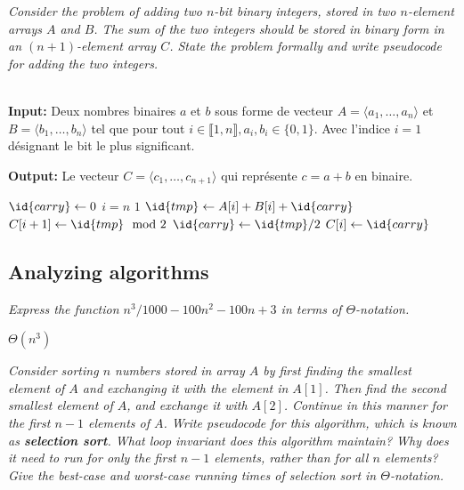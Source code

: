 \begin{description}
\begin{ex}
\end{ex}

 {\itshape Consider the problem of adding two $n$-bit binary integers, stored in two $n$-element arrays $A$ and $B$. The sum of the two integers should be stored in binary form in an $(n+1)$-element array $C$.  State the problem formally and write pseudocode for adding the two integers.}

  \begin{ex}\\
    {\bfseries Input:} Deux nombres binaires $a$ et $b$ sous forme de vecteur $A = \langle a_1, \ldots, a_n \rangle$ et $B = \langle b_1, \ldots, b_n \rangle$ tel que pour tout $i \in \llbracket 1,n \rrbracket, a_i, b_i \in \{0,1\}$. Avec l'indice $i=1$ désignant le bit le plus significant.

    {\bfseries Output:} Le vecteur $C = \langle c_1, \ldots, c_{n+1} \rangle$ qui représente $c = a+b$ en binaire.
    
    \begin{codebox}
      \li $\id{carry} \gets 0 $
      \li \For $i=n$ \Downto $1$ \Do
      \li $\id{tmp} \gets A[i] + B[i] + \id{carry}$
      \li $C[i+1] \gets \id{tmp} \mod 2$
      \li $\id{carry} \gets \id{tmp}/2$\End
      \li $C[i] \gets \id{carry}$
    \end{codebox}
    
  \end{ex}
\subsection{Analyzing algorithms}

 {\itshape Express the function $n^3/1000-100n^2-100n+3$ in terms of $\Theta$-notation.}
  \begin{ex}
    $\Theta(n^3)$
  \end{ex}

 {\itshape
  Consider sorting $n$ numbers stored in array $A$ by first finding the smallest element of $A$ and exchanging it with the element in $A[1]$. Then find the second smallest element of $A$, and exchange it with $A[2]$. Continue in this manner for the first $n-1$ elements of $A$. Write pseudocode for this algorithm, which is known as {\bfseries selection sort}. What loop invariant does this algorithm maintain? Why does it need to run for only the first $n-1$ elements, rather than for all $n$ elements? Give the best-case and worst-case running times of selection sort in $\Theta$-notation.}


\end{description}
